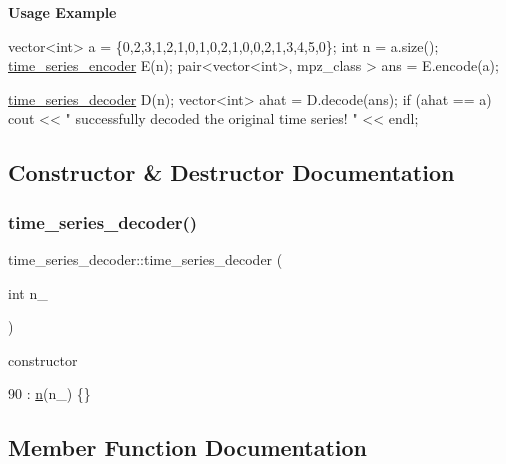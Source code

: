 {\bfseries Usage Example}


\begin{DoxyCode}
vector<int> a = \{0,2,3,1,2,1,0,1,0,2,1,0,0,2,1,3,4,5,0\};
\textcolor{keywordtype}{int} n = a.size();
\hyperlink{classtime__series__encoder}{time\_series\_encoder} E(n);
pair<vector<int>, mpz\_class > ans = E.encode(a);

\hyperlink{classtime__series__decoder}{time\_series\_decoder} D(n);
vector<int> ahat = D.decode(ans);
\textcolor{keywordflow}{if} (ahat == a)
   cout << \textcolor{stringliteral}{" successfully decoded the original time series! "} << endl;
\end{DoxyCode}
 

\subsection{Constructor \& Destructor Documentation}
\mbox{\label{classtime__series__decoder_a087e4c5d516210043e58a4683a767d93}} 
\subsubsection{\texorpdfstring{time\+\_\+series\+\_\+decoder()}{time\_series\_decoder()}}
{\footnotesize\ttfamily time\+\_\+series\+\_\+decoder\+::time\+\_\+series\+\_\+decoder (\begin{DoxyParamCaption}\item[{int}]{n\+\_\+ }\end{DoxyParamCaption})\hspace{0.3cm}{\ttfamily [inline]}}



constructor 


\begin{DoxyCode}
90 : \hyperlink{classtime__series__decoder_a05f75c42ac2acd63766714e6e09f1a65}{n}(n\_) \{\}
\end{DoxyCode}


\subsection{Member Function Documentation}
\mbox{\label{classtime__series__decoder_a4b28eb8883c68f5502c43a802424e0c3}} 
